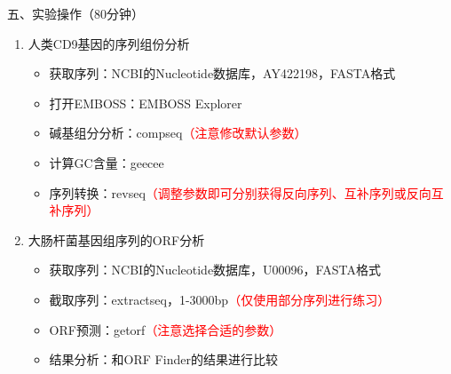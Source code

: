 \documentclass{TIJMUjiaoanSY}
\begin{document}
\noindent
五、实验操作（80分钟）
\begin{enumerate}
  \item 人类CD9基因的序列组份分析
    \begin{itemize}
      \item 获取序列：NCBI的Nucleotide数据库，AY422198，FASTA格式
      \item 打开EMBOSS：EMBOSS Explorer
      \item 碱基组分分析：compseq\textcolor{red}{（注意修改默认参数）}
      \item 计算GC含量：geecee
      \item 序列转换：revseq\textcolor{red}{（调整参数即可分别获得反向序列、互补序列或反向互补序列）}
    \end{itemize}
  \item 大肠杆菌基因组序列的ORF分析
    \begin{itemize}
      \item 获取序列：NCBI的Nucleotide数据库，U00096，FASTA格式
      \item 截取序列：extractseq，1-3000bp\textcolor{red}{（仅使用部分序列进行练习）}
      \item ORF预测：getorf\textcolor{red}{（注意选择合适的参数）}
      \item 结果分析：和ORF Finder的结果进行比较
    \end{itemize}
\end{enumerate}

\otherTail
\end{document}
